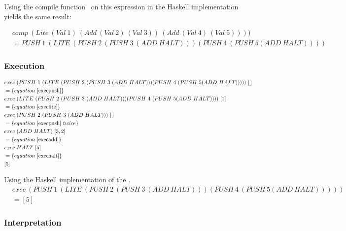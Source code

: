\documentclass {article}
\begin{document}
Using the compile function \comp\ on this expression 
in the Haskell implementation yields the same result:

\begin{align*}	
&comp\ (Lite\ (Val\ 1)\
		 (Add\ (Val\ 2)\ (Val\ 3))\ 
		(Add\ (Val\ 4)\ (Val\ 5)))) \\
&= PUSH\ 1\ (LITE\ 
		(PUSH\ 2\ (PUSH\ 3\ 
		(ADD\ HALT))) 
		(PUSH\ 4\ (PUSH\ 5 (ADD\ HALT))))
\end{align*}

\subsubsection{Execution}


\begin{align*}
&exec\ (PUSH\ 1\ (LITE\ (PUSH\ 2\ (PUSH\ 3\ (ADD\ HALT))) (PUSH\ 4\ (PUSH\ 5 (ADD\ HALT)))))\ [\, ] \\
&=\{equation\ \ref{execpush} \} \\
&exec\ (LITE\ (PUSH\ 2\ (PUSH\ 3\ (ADD\ HALT))) (PUSH\ 4\ (PUSH\ 5 (ADD\ HALT))))\ [1] \\
&=\{equation\ \ref{execlite} \} \\
&exec\ (PUSH\ 2\ (PUSH\ 3\ (ADD\ HALT)))\ [\, ] \\
&=\{equation\ \ref{execpush}\ twice \} \\
&exec\ (ADD\ HALT)\ [3, 2] \\
&=\{equation\ \ref{execadd} \} \\
&exec\ HALT\ [5] \\
&= \{equation\ \ref{exechalt}\} \\
&[5]
\end{align*}

Using the Haskell implementation of the \vm.
\begin{align*}	
&exec\ (PUSH\ 1\ (LITE\ 
	(PUSH\ 2\ (PUSH\ 3\ (ADD\ HALT))) 
	(PUSH\ 4\ (PUSH\ 5 (ADD\ HALT))))) \\
&= [5]
\end{align*}

\subsubsection{Interpretation}
\end{document}
